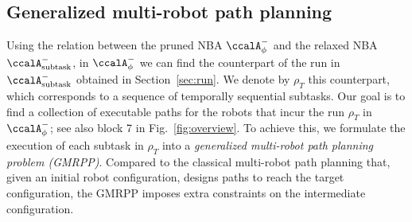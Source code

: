 \documentclass[Afour,sageh,times]{sagej}
\newcommand{\auto}[1]{\ccalA_{\textup{#1}}}
\newcommand{\autop}{\ccalA_{\phi}}
\begin{document}
 {\subsection{Generalized multi-robot path planning}\label{sec:mapp}
   Using  the relation between the pruned NBA  $\autop^-$ and the relaxed NBA $\auto{subtask}^-$, in $\autop^-$ we can find the counterpart  of the  run in $\auto{subtask}^-$ obtained in Section~\ref{sec:run}. We denote by $\rho_T$ this counterpart, which corresponds to  a sequence of temporally sequential subtasks. Our goal is to find a collection of executable paths for the robots that incur the run $\rho_T$ in $\autop^-$; see also block 7 in Fig.~\ref{fig:overview}. To achieve this, we formulate  the execution of each subtask in $\rho_T$ into a {\it generalized multi-robot path planning problem (GMRPP)}. Compared to the classical multi-robot path planning that, given an initial robot configuration, designs paths to reach the target configuration, the GMRPP imposes extra constraints on the intermediate configuration.


}
\end{document}
